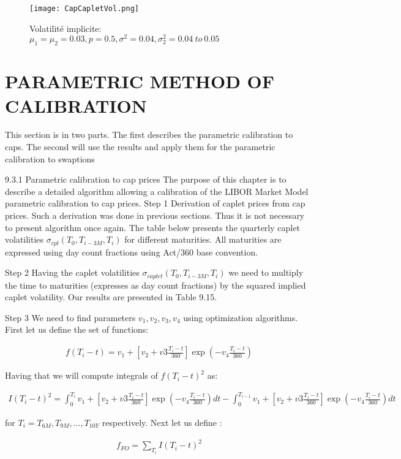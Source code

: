 \documentclass[11pt]{article}
\numberwithin{equation}{subsection}
\begin{document}
\begin{figure}[H]
	\texttt{[image: CapCapletVol.png]}
	\caption{Volatilité implicite: \(\mu_1=\mu_2=0.03, p=0.5, \sigma^2=0.04, \sigma_2^2=0.04 \ to \ 0.05\)}	
\end{figure}


\section{PARAMETRIC METHOD OF CALIBRATION}
This section is in two parts. The first describes the parametric calibration to caps. The second
will use the results and apply them for the parametric calibration to swaptions


9.3.1 Parametric calibration to cap prices
The purpose of this chapter is to describe a detailed algorithm allowing a calibration of the
LIBOR Market Model parametric calibration to cap prices.
Step 1
Derivation of caplet prices from cap prices.
Such a derivation was done in previous sections. Thus it is not necessary to present algorithm
once again. The table below presents the quarterly caplet volatilities \(\sigma_{cpl}(T_{0}, T_{i-3M}, T_{i})\) for
different maturities. All maturities are expressed using day count fractions using Act/360
base convention.


Step 2
Having the caplet volatilities \(\sigma_{caplet}(T_{0}, T_{i-3M}, T_{i})\) we need to multiply the time to maturities
(expresses as day count fractions) by the squared implied caplet volatility. Our results are
presented in Table 9.15.

Step 3
We need to find parameters \(v_1, v_2, v_3, v_4\) using optimization algorithms. First let us define
the set of functions:

\begin{eqnarray*}
	f(T_i - t) = v_1 + [v_2 + v3 \frac{T_i-t}{360}] \exp(-v_4 \frac{T_i-t}{360})
\end{eqnarray*}

Having that we will compute integrals of \(f(T_i - t)^2\) as:

\begin{eqnarray*}
	I(T_i - t)^2 = \int_{0}^{T_i} v_1 + [v_2 + v3 \frac{T_i-t}{360}] \exp(-v_4 \frac{T_i-t}{360}) dt
	- \int_{0}^{T_{i-1}} v_1 + [v_2 + v3 \frac{T_i-t}{360}] \exp(-v_4 \frac{T_i-t}{360}) dt
\end{eqnarray*}

for \(T_i = T_{6M}, T_{9M},..., T_{10Y}\) respectively.
Next let us define :

\begin{eqnarray*}
	f_{FO} = \sum_{T_i} I(T_i - t)^2
\end{eqnarray*}
\end{document}

